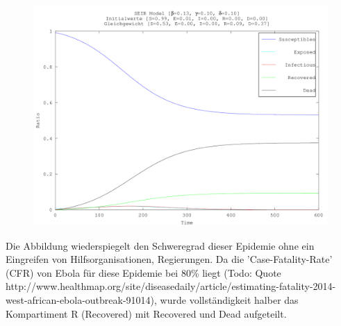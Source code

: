 \begin{refsection}
\begin{figure}[H]
	\centering
	\includegraphics[width=1\textwidth]{sir/ebola_outbreak.png}
\end{figure}
Die Abbildung wiederspiegelt den Schweregrad dieser Epidemie ohne ein Eingreifen von Hilfsorganisationen, Regierungen. Da die 'Case-Fatality-Rate' (CFR) von Ebola für diese Epidemie bei 80\% liegt (Todo: Quote http://www.healthmap.org/site/diseasedaily/article/estimating-fatality-2014-west-african-ebola-outbreak-91014), wurde vollständigkeit halber das Kompartiment R (Recovered) mit Recovered und Dead aufgeteilt.


\end{refsection}
